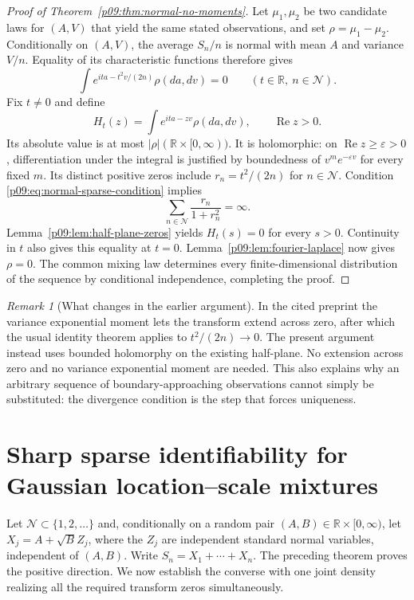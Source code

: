 \documentclass[11pt,letterpaper]{article}
\theoremstyle{definition}
\theoremstyle{remark}
\newtheorem{remark}[theorem]{Remark}
\renewcommand{\Re}{\operatorname{Re}}
\newcommand{\1}{\mathbf 1}
\begin{document}
\begin{proof}[Proof of Theorem~\ref{p09:thm:normal-no-moments}]
Let $\mu_1,\mu_2$ be two candidate laws for $(A,V)$ that yield the
same stated observations, and set $\rho=\mu_1-\mu_2$.
Conditionally on $(A,V)$, the average $S_n/n$ is normal with mean
$A$ and variance $V/n$. Equality of its characteristic functions
therefore gives
\begin{equation}\label{p09:eq:normal-data-zero}
       \int e^{ita-t^2v/(2n)}\rho(da,dv)=0
                   \qquad(t\in\mathbb R,\ n\in\mathcal N).
\end{equation}
Fix $t\ne0$ and define
\[
                H_t(z)=\int e^{ita-zv}\rho(da,dv),\qquad\Re z>0.
\]
Its absolute value is at most $|\rho|(\mathbb R\times[0,\infty))$.
It is holomorphic: on $\Re z\geq\varepsilon>0$, differentiation
under the integral is justified by boundedness of
$v^m e^{-\varepsilon v}$ for every fixed $m$.
Its distinct positive zeros include $r_n=t^2/(2n)$ for
$n\in\mathcal N$. Condition \eqref{p09:eq:normal-sparse-condition}
implies
\[
           \sum_{n\in\mathcal N}\frac{r_n}{1+r_n^2}=\infty.
\]
Lemma~\ref{p09:lem:half-plane-zeros} yields $H_t(s)=0$ for every $s>0$.
Continuity in $t$ also gives this equality at $t=0$.
Lemma~\ref{p09:lem:fourier-laplace} now gives $\rho=0$.
The common mixing law determines every finite-dimensional distribution
of the sequence by conditional independence, completing the proof.
\end{proof}

\begin{remark}[What changes in the earlier argument]
In the cited preprint the variance exponential moment lets the
transform extend across zero, after which the usual identity theorem
applies to $t^2/(2n)\to0$. The present argument instead uses
bounded holomorphy on the existing half-plane. No extension across zero
and no variance exponential moment are needed. This also explains why
an arbitrary sequence of boundary-approaching observations cannot
simply be substituted: the divergence condition is the step that
forces uniqueness.
\end{remark}





\section{Sharp sparse identifiability for Gaussian location--scale mixtures}

Let $\mathcal N\subset\{1,2,\ldots\}$ and, conditionally on a random
pair $(A,B)\in\mathbb R\times[0,\infty)$, let
$X_j=A+\sqrt B Z_j$, where the $Z_j$ are independent standard normal
variables, independent of $(A,B)$.  Write $S_n=X_1+\cdots+X_n$.
The preceding theorem proves the positive direction. We now establish
the converse with one joint density realizing all the required transform
zeros simultaneously.
\end{document}
